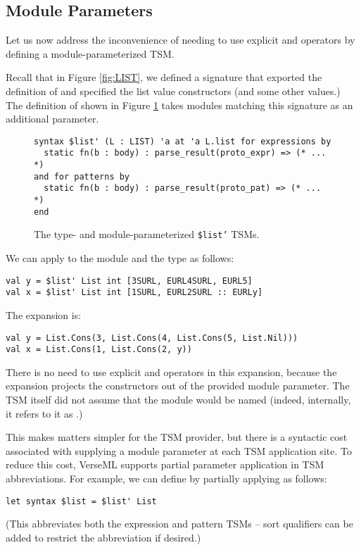 \subsection{Module Parameters}\label{sec:module-parameters}
Let us now address the inconvenience of needing to use explicit  and   operators by  defining a module-parameterized TSM.

Recall that in Figure \ref{fig:LIST}, we defined a signature  that exported the definition of  and specified the list value constructors (and some other values.) The definition of  shown in Figure \ref{fig:ptsm-listprime} takes modules matching this signature as an additional parameter.

\begin{figure}[h]
\begin{lstlisting}[numbers=none]
syntax $list' (L : LIST) 'a at 'a L.list for expressions by 
  static fn(b : body) : parse_result(proto_expr) => (* ... *)
and for patterns by 
  static fn(b : body) : parse_result(proto_pat) => (* ... *)
end
\end{lstlisting}
\caption{The type- and module-parameterized \texttt{\$list'} TSMs.}
\label{fig:ptsm-listprime}
\end{figure}

We can apply  to the module  and the type  as follows:
\begin{lstlisting}[numbers=none]
val y = $list' List int [3SURL, EURL4SURL, EURL5]
val x = $list' List int [1SURL, EURL2SURL :: EURLy]
\end{lstlisting}
The expansion is:
\begin{lstlisting}[numbers=none]
val y = List.Cons(3, List.Cons(4, List.Cons(5, List.Nil)))
val x = List.Cons(1, List.Cons(2, y))
\end{lstlisting}
There is no need to use explicit  and  operators in this expansion, because the expansion projects the constructors out of the provided module parameter. The TSM itself did not assume that the module would be named  (indeed, internally, it refers to it as .)

This makes matters simpler for the TSM provider, but there is a syntactic cost associated with supplying a module parameter at each TSM application site. To reduce this cost, VerseML supports partial parameter application in TSM abbreviations. For example, we can define  by partially applying  as follows:
\begin{lstlisting}[numbers=none]
let syntax $list = $list' List
\end{lstlisting}
(This abbreviates both the expression and pattern TSMs -- sort qualifiers can be added to restrict the abbreviation if desired.)


